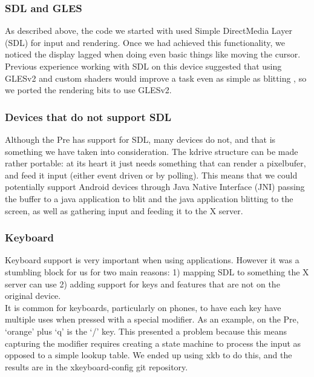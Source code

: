\subsubsection{SDL and GLES}
As described above, the code we started with  used Simple DirectMedia Layer (SDL) \cite{sdl} for input and rendering.  Once we had achieved this functionality, we noticed the display lagged when doing even basic things like moving the cursor.  Previous experience working with SDL on this device suggested that using GLESv2 \cite{gles} and custom shaders would improve a task even as simple as blitting , so we ported the rendering bits to use GLESv2. \\

\subsubsection{Devices that do not support SDL}
Although the Pre has support for SDL, many devices do not, and that is something we have taken into consideration.  The kdrive structure can be made rather portable: at its heart it just needs something that can render a pixelbufer, and feed it input (either event driven or by polling).  This means that we could potentially support Android devices through Java Native Interface (JNI) \cite{jni} passing the buffer to a java application to blit and the java application blitting to the screen, as well as gathering input and feeding it to the X server. \\

\subsubsection{Keyboard}
Keyboard support is very important when using applications.  However it was a stumbling block for us for two main reasons: 1) mapping SDL to something the X server can use 2) adding support for keys and features that are not on the original device.\\

It is common for keyboards, particularly on phones, to have each key have multiple uses when pressed with a special modifier.  As an example, on the Pre, `orange' plus `q' is the `/' key.  This presented a problem because this means capturing the modifier requires creating a state machine to process the input as opposed to a simple lookup table.  We ended up using xkb to do this, and the results are in the xkeyboard-config git repository. \\

